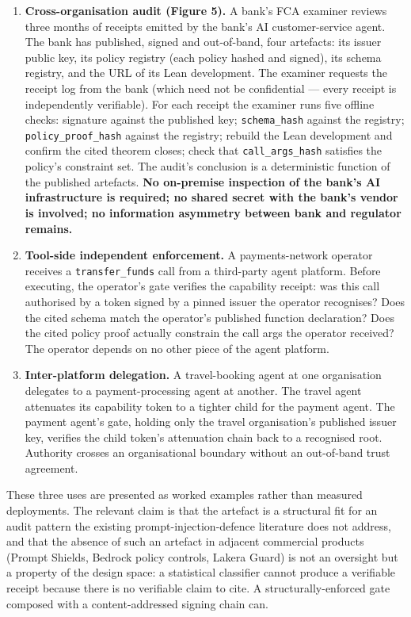 \begin{enumerate}
\def\labelenumi{\arabic{enumi}.}
\item
  \textbf{Cross-organisation audit (Figure 5).} A bank's FCA examiner
  reviews three months of receipts emitted by the bank's AI
  customer-service agent. The bank has published, signed and
  out-of-band, four artefacts: its issuer public key, its policy
  registry (each policy hashed and signed), its schema registry, and the
  URL of its Lean development. The examiner requests the receipt log
  from the bank (which need not be confidential --- every receipt is
  independently verifiable). For each receipt the examiner runs five
  offline checks: signature against the published key;
  \texttt{schema\_hash} against the registry;
  \texttt{policy\_proof\_hash} against the registry; rebuild the Lean
  development and confirm the cited theorem closes; check that
  \texttt{call\_args\_hash} satisfies the policy's constraint set. The
  audit's conclusion is a deterministic function of the published
  artefacts. \textbf{No on-premise inspection of the bank's AI
  infrastructure is required; no shared secret with the bank's vendor is
  involved; no information asymmetry between bank and regulator
  remains.}
\item
  \textbf{Tool-side independent enforcement.} A payments-network
  operator receives a \texttt{transfer\_funds} call from a third-party
  agent platform. Before executing, the operator's gate verifies the
  capability receipt: was this call authorised by a token signed by a
  pinned issuer the operator recognises? Does the cited schema match the
  operator's published function declaration? Does the cited policy proof
  actually constrain the call args the operator received? The operator
  depends on no other piece of the agent platform.
\item
  \textbf{Inter-platform delegation.} A travel-booking agent at one
  organisation delegates to a payment-processing agent at another. The
  travel agent attenuates its capability token to a tighter child for
  the payment agent. The payment agent's gate, holding only the travel
  organisation's published issuer key, verifies the child token's
  attenuation chain back to a recognised root. Authority crosses an
  organisational boundary without an out-of-band trust agreement.
\end{enumerate}

These three uses are presented as worked examples rather than measured
deployments. The relevant claim is that the artefact is a structural fit
for an audit pattern the existing prompt-injection-defence literature
does not address, and that the absence of such an artefact in adjacent
commercial products (Prompt Shields, Bedrock policy controls, Lakera
Guard) is not an oversight but a property of the design space: a
statistical classifier cannot produce a verifiable receipt because there
is no verifiable claim to cite. A structurally-enforced gate composed
with a content-addressed signing chain can.

